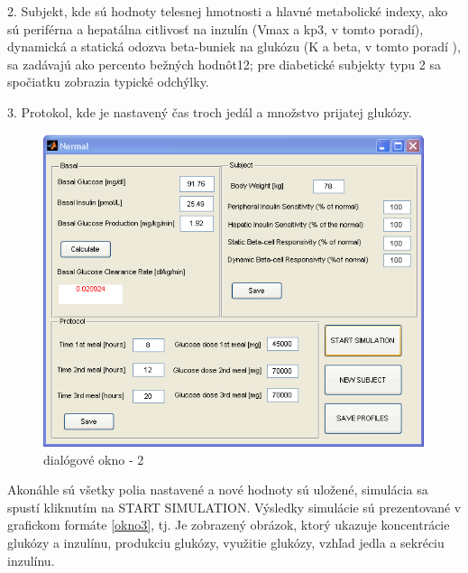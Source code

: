 2. Subjekt, kde sú hodnoty telesnej hmotnosti a hlavné metabolické indexy, ako sú periférna a hepatálna citlivosť na inzulín (Vmax a kp3, v tomto poradí), dynamická a statická odozva beta-buniek na glukózu (K a beta, v tomto poradí ), sa zadávajú ako percento bežných hodnôt12; pre diabetické subjekty typu 2 sa spočiatku zobrazia typické odchýlky. \cite{2007}

3. Protokol, kde je nastavený čas troch jedál a množstvo prijatej glukózy. \cite{2007}

\begin{figure}[H]
\centering
\includegraphics[scale=0.8]{ob-2.PNG}
\caption{dialógové okno - 2 \cite{2007}}
\label{okno2}
\end{figure}

Akonáhle sú všetky polia nastavené a nové hodnoty sú uložené, simulácia sa spustí kliknutím na START SIMULATION. Výsledky simulácie sú prezentované v grafickom formáte \ref{okno3}, tj. Je zobrazený obrázok, ktorý ukazuje koncentrácie glukózy a inzulínu, produkciu glukózy, využitie glukózy, vzhľad jedla a sekréciu inzulínu.\cite{2007}

